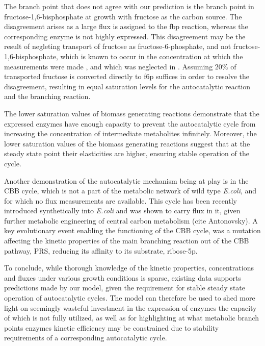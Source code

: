 \documentclass[a4page,notitlepage]{article}
\begin{document}
    The branch point that does not agree with our prediction is the branch point in fructose-1,6-bisphosphate at growth with fructose as the carbon source.
    The disagreement arises as a large flux is assigned to the fbp reaction, whereas the corresponding enzyme is not highly expressed.
    This disagreement may be the result of negleting transport of fructose as fructose-6-phosphate, and not fructose-1,6-bisphosphate, which is known to occur in the concentration at which the measurements were made \cite{Kornberg1990-ft}, and which was neglected in \cite{Gerosa2015-oq}.
    Assuming $20\%$ of transported fructose is converted directly to f6p suffices in order to resolve the disagreement, resulting in equal saturation levels for the autocatalytic reaction and the branching reaction.

    The lower saturation values of biomass generating reactions demonstrate that the expressed enzymes have enough capacity to prevent the autocatalytic cycle from increasing the concentration of intermediate metabolites infinitely.
    Moreover, the lower saturation values of the biomass generating reactions suggest that at the steady state point their elasticities are higher, ensuring stable operation of the cycle.

    Another demonstration of the autocatalytic mechanism being at play is in the CBB cycle, which is not a part of the metabolic network of wild type \emph{E.coli}, and for which no flux measurements are available.
    This cycle has been recently introduced synthetically into \emph{E.coli} and was shown to carry flux in it, given further metabolic engineering of central carbon metabolism \cite{Antonovski2016} (cite Antonovsky).
    A key evolutionary event enabling the functioning of the CBB cycle, was a mutation affecting the kinetic properties of the main branching reaction out of the CBB pathway, PRS, reducing its affinity to its substrate, ribose-5p.

    To conclude, while thorough knowledge of the kinetic properties, concentrations and fluxes under various growth conditions is sparse, existing data supports predictions made by our model, given the requirement for stable steady state operation of autocatalytic cycles.
    The model can therefore be used to shed more light on seemingly wasteful investment in the expression of enzymes the capacity of which is not fully utilized, as well as for highlighting at what metabolic branch points enzymes kinetic efficiency may be constrained due to stability requirements of a corresponding autocatalytic cycle.
\end{document}
